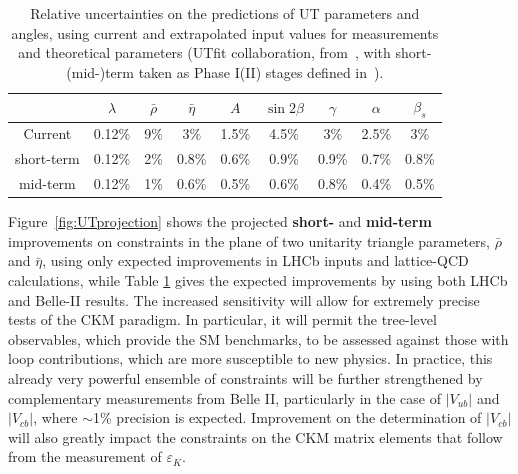 \begin{table}
\caption{Relative uncertainties on the predictions of UT parameters and angles, using current and extrapolated input values for measurements and theoretical parameters (UTfit collaboration, from~\cite{Cerri:2018ypt}, with short-(mid-)term taken as Phase I(II) stages defined in~\cite{Cerri:2018ypt}).}
\label{tab:utfit_global}
{\footnotesize
 \begin{center}
       \begin{tabular}{ccccccccc}
               \hline\hline
                & $\lambda$ & $\bar{\rho}$ & $\bar{\eta}$ & $A$ & $\sin2\beta$ & $\gamma$ & $\alpha$ & $\beta_s$ \\ \hline
                       Current &0.12\%& 9\% & 3\% & 1.5\% & 4.5\% & 3\% & 2.5\% & 3\% \\
                       short-term  &0.12\%& 2\% & 0.8\% & 0.6\% & 0.9\% &  0.9\% & 0.7\% & 0.8\%\\
                       mid-term  &0.12\%& 1\% & 0.6\% & 0.5\% & 0.6\% & 0.8\% & 0.4\% & 0.5\%\\ \hline
       \hline
       \end{tabular}
\end{center}
}
\end{table}



Figure~\ref{fig:UTprojection} shows the projected {\bf short-} and {\bf mid-term} improvements on constraints in the plane of two unitarity triangle parameters, $\bar{\rho}$ and $\bar{\eta}$, using only expected improvements in LHCb inputs and lattice-QCD calculations, while Table \ref{tab:utfit_global} gives the expected improvements by using both LHCb and Belle-II results. The increased sensitivity will allow for extremely precise tests of the CKM paradigm. In particular, it will permit the tree-level observables, which provide the SM benchmarks, to  be assessed against  those with loop contributions, which are more susceptible to new physics.  In practice, this already very powerful ensemble of constraints will be 
further strengthened by complementary measurements from Belle II, particularly in the case of $|V_{ub}|$ and $|V_{cb}|$, where $\sim $1\% precision is expected. Improvement on the determination of $|V_{cb}|$ will also greatly impact the constraints on the CKM matrix elements that follow from the measurement of $\varepsilon_K$.

